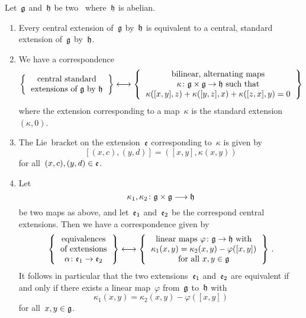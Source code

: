 \begin{theorem}
	\label{structure of central extensions}
	Let~$\mathfrak{g}$ and~$\mathfrak{h}$ be two~\liealgebras{$\kf$} where~$\mathfrak{h}$ is abelian.
	\begin{enumerate}
		\item
			Every central extension of~$\mathfrak{g}$ by~$\mathfrak{h}$ is equivalent to a central, standard extension of~$\mathfrak{g}$ by~$\mathfrak{h}$.
		\item
			We have a {\onetoonetext} correspondence
			\[
				\left\{
					\begin{tabular}{c}
						central standard \\
						extensions of~$\glie$ by~$\hlie$
					\end{tabular}
				\right\}
				\onetoone
				\left\{
					\begin{tabular}{c}
						bilinear, alternating maps \\
						$\kappa \colon \glie \times \glie \to \hlie$ such that \\
						$\kappa([x,y], z) + \kappa([y,z], x) + \kappa([z, x], y) = 0$
					\end{tabular}
				\right\}
			\]
			where the extension corresponding to a map~$\kappa$ is the standard extension~$(\kappa, 0)$.
		\item
			The Lie~bracket on the extension~$\mathfrak{e}$ corresponding to~$\kappa$ is given by
			\[
				[ (x,c), (y,d) ]
				=
				( [x,y], \kappa(x,y) )
			\]
			for all~$(x,c), (y,d) \in \mathfrak{e}$.
		\item
			Let
			\[
				\kappa_1, \kappa_2
				\colon
				\glie \times \glie
				\to
				\hlie
			\]
			be two maps as above, and let~$\mathfrak{e}_1$ and~$\mathfrak{e}_2$ be the correspond central extensions.
			Then we have a {\onetoonetext} correspondence given by
			\[
				\left\{
					\begin{tabular}{c}
						equivalences \\ of extensions \\
						$\alpha \colon \elie_1 \to \elie_2$
					\end{tabular}
				\right\}
				\onetoone
				\left\{
					\begin{tabular}{c}
						linear maps~$\varphi \colon \glie \to \hlie$ with \\
						$\kappa_1(x,y) = \kappa_2(x,y) - \varphi([x,y])$ \\
						for all~$x, y \in \glie$
					\end{tabular}
				\right\} \,.
			\]
			It follows in particular that the two extensions~$\mathfrak{e}_1$ and~$\mathfrak{e}_2$ are equivalent if and only if there exists a linear map~$\varphi$ from~$\mathfrak{g}$ to~$\mathfrak{h}$ with
			\[
				\kappa_1(x,y)
				=
				\kappa_2(x,y)
				-
				\varphi([x,y])
			\]
			for all~$x, y \in \mathfrak{g}$.
	\end{enumerate}
\end{theorem}


